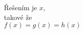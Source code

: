 \documentclass[preview]{standalone}
\begin{document}
\begin{center}
Řešením je $x$,\\ takové že\\ $f(x)=g(x)=h(x)$
\end{center}
\end{document}
